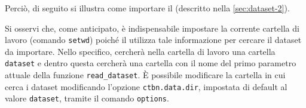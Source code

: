 Perciò, di seguito si illustra come importare il  (descritto nella \vref{sec:dataset-2}).

\vspace*{8pt}
Si osservi che, come anticipato, è indispensabile impostare la corrente cartella di lavoro (comando \lstinline$setwd$) poiché il \pacchettor{} utilizza tale informazione per cercare il dataset da importare. Nello specifico, \rctbn{} cercherà nella cartella di lavoro una cartella \lstinline$dataset$ e dentro questa cercherà una cartella con il nome del primo parametro attuale della funzione \lstinline[language=rstats]{read_dataset}. \`E possibile modificare la cartella in cui \rctbn{} cerca i dataset modificando l'opzione \lstinline$ctbn.data.dir$, impostata di default al valore \lstinline$dataset$, tramite il comando \lstinline[language=rstats]{options}.

